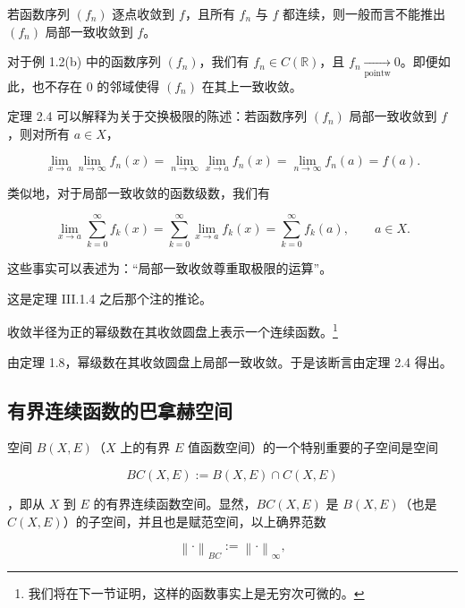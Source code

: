 \begin{remark}

\begin{items}
\item

若函数序列 $ (f_{n}) $ 逐点收敛到 $ f $，且所有 $ f_{n} $ 与 $ f $ 都连续，则一般而言不能推出 $ (f_{n}) $ 局部一致收敛到 $ f $。

\proofhead
对于例 1.2(b) 中的函数序列 $ (f_n) $，我们有 $ f_n \in C(\mathbb{R}) $，且 $ f_n \xrightarrow[\text{pointw}]{} 0 $。即便如此，也不存在 $ 0 $ 的邻域使得 $ (f_n) $ 在其上一致收敛。
\item

定理 2.4 可以解释为关于交换极限的陈述：若函数序列 $ (f_n) $ 局部一致收敛到 $ f $，则对所有 $ a \in X $，

\[
\lim_{x\to a}\lim_{n\to\infty}f_{n}(x)=\lim_{n\to\infty}\lim_{x\to a}f_{n}(x)=\lim_{n\to\infty}f_{n}(a)=f(a).
\]

类似地，对于局部一致收敛的函数级数，我们有

\[
\lim_{x\to a}\sum_{k=0}^{\infty}f_{k}(x)=\sum_{k=0}^{\infty}\lim_{x\to a}f_{k}(x)=\sum_{k=0}^{\infty}f_{k}(a),\qquad a\in X.
\]

这些事实可以表述为：“局部一致收敛尊重取极限的运算”。

\proofhead
这是定理 III.1.4 之后那个注的推论。
\item

收敛半径为正的幂级数在其收敛圆盘上表示一个连续函数。\footnote{我们将在下一节证明，这样的函数事实上是无穷次可微的。}

\proofhead
由定理 1.8，幂级数在其收敛圆盘上局部一致收敛。于是该断言由定理 2.4 得出。
\end{items}

\end{remark}

\subsection*{有界连续函数的巴拿赫空间}

空间 $B(X,E)$（$X$ 上的有界 $E$ 值函数空间）的一个特别重要的子空间是空间

\[
BC(X,E):=B(X,E)\cap C(X,E)
\]

，即从 $ X $ 到 $ E $ 的有界连续函数空间。显然，$ BC(X,E) $ 是 $ B(X,E) $（也是 $ C(X,E) $）的子空间，并且也是赋范空间，以上确界范数

\[
\left\|\cdot\right\|_{B C}:=\left\|\cdot\right\|_{\infty},
\]

